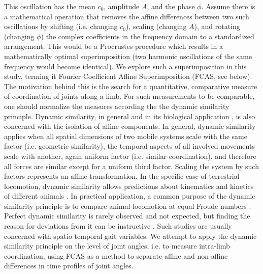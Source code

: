 \documentclass[10pt, a4paper]{article}
\begin{document}
This oscillation has the mean $c_0$, amplitude $A$, and the phase $\phi$. 
Assume there is a mathematical operation that removes the affine differences between two such oscillations by shifting (i.e. changing $c_0$), scaling (changing $A$), and rotating (changing $\phi$) the complex coefficients in the frequency domain to a standardized arrangement. 
This would be a Procrustes procedure which results in a mathematically optimal superimposition (two harmonic oscillations of the same frequency would become identical).  
We explore such a superimposition in this study, terming it Fourier Coefficient Affine Superimposition (FCAS, see below). 
\\The motivation behind this is the search for a quantitative, comparative measure of coordination of joints along a limb. 
For such measurements to be comparable, one should normalize the measures according the the dynamic similarity principle. 
Dynamic similarity, in general and in its biological application \citep[\textit{cf.}][]{Alexander1983,Vaughan2005}, is also concerned with the isolation of affine components. 
In general, dynamic similarity applies when all spatial dimensions of two mobile systems scale with the same factor (i.e. geometric similarity), the temporal aspects of all involved movements scale with another, again uniform factor (i.e. similar coordination), and therefore all forces are similar except for a uniform third factor. 
Scaling the system by such factors represents an affine transformation. 
In the specific case of terrestrial locomotion, dynamic similarity allows predictions about kinematics and kinetics of different animals \citep[i.e. about leg phasing, relative stride length, duty factors, forces and power output;][]{Alexander1983}.
In practical application, a common purpose of the dynamic similarity principle is to compare animal locomotion at equal Froude numbers \citep[e.g.][]{SteudelNumbers2006,Holmes2006}. 
Perfect dynamic similarity is rarely observed and not expected, but finding the reason for deviations from it can be instructive \citep[e.g.][]{SteudelNumbers2006,Raichlen2013,Kramer2013}. 
Such studies are usually concerned with spatio-temporal gait variables. 
We attempt to apply the dynamic similarity principle on the level of joint angles, i.e. to measure intra-limb coordination, using FCAS as a method to separate affine and non-affine differences in time profiles of joint angles. 
\end{document}
